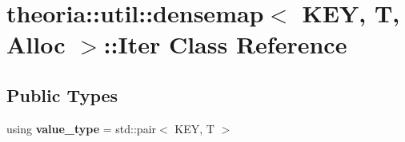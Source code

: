 \hypertarget{classtheoria_1_1util_1_1densemap_1_1Iter}{}\section{theoria\+:\+:util\+:\+:densemap$<$ K\+EY, T, Alloc $>$\+:\+:Iter Class Reference}
\label{classtheoria_1_1util_1_1densemap_1_1Iter}
\subsection*{Public Types}
\begin{DoxyCompactItemize}
\item 
\mbox{\label{classtheoria_1_1util_1_1densemap_1_1Iter_a8a1cedbd37c4faee8284d6f1debd49f2}} 
using {\bfseries value\+\_\+type} = std\+::pair$<$ K\+EY, T $>$
\end{DoxyCompactItemize}
